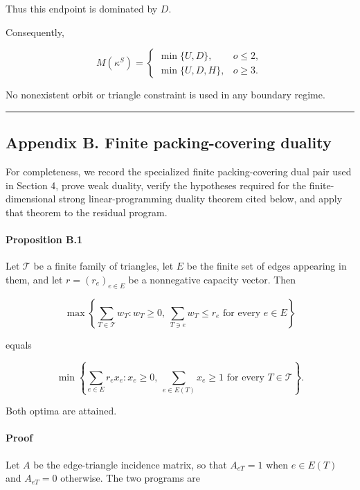 \documentclass[
  american,
  11pt,
  a4paper,
]{article}
\newcounter{none} %
\begin{document}
Thus this endpoint is dominated by \(D\).

Consequently,

\[
M(\kappa^S)
=
\begin{cases}
\min\{U,D\},&o\le2,\\[1mm]
\min\{U,D,H\},&o\ge3.
\end{cases}
\]

No nonexistent orbit or triangle constraint is used in any boundary regime.

\begin{center}\rule{0.5\linewidth}{0.5pt}\end{center}

\subsection{Appendix B. Finite packing-covering duality}\label{appendix-b.-finite-packing-covering-duality}

For completeness, we record the specialized finite packing-covering dual pair used in Section 4, prove weak duality, verify the hypotheses required for the finite-dimensional strong linear-programming duality theorem cited below, and apply that theorem to the residual program.

\paragraph{Proposition B.1}\label{proposition-b.1}

Let \(\mathcal T\) be a finite family of triangles, let \(E\) be the finite set of edges appearing in them, and let \(r=(r_e)_{e\in E}\) be a nonnegative capacity vector. Then

\[
\max\left\{
\sum_{T\in\mathcal T}w_T:
w_T\ge0,\ 
\sum_{T\ni e}w_T\le r_e
\text{ for every }e\in E
\right\}
\]

equals

\[
\min\left\{
\sum_{e\in E}r_ex_e:
x_e\ge0,\ 
\sum_{e\in E(T)}x_e\ge1
\text{ for every }T\in\mathcal T
\right\}.
\]

Both optima are attained.

\paragraph{Proof}\label{proof-2}

Let \(A\) be the edge-triangle incidence matrix, so that \(A_{eT}=1\) when \(e\in E(T)\) and \(A_{eT}=0\) otherwise. The two programs are
\end{document}
